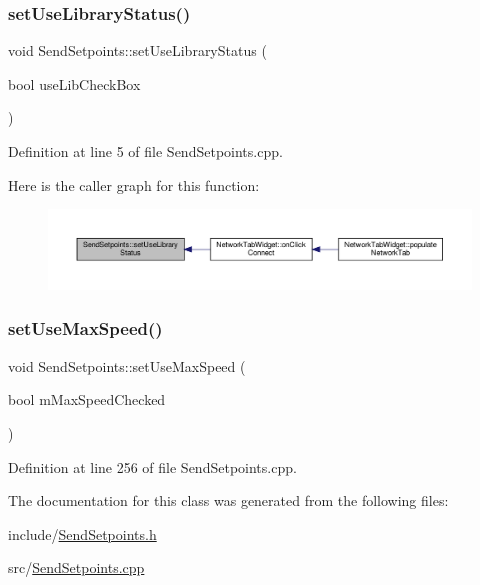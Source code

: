 \subsubsection{\texorpdfstring{set\+Use\+Library\+Status()}{setUseLibraryStatus()}}
{\footnotesize\ttfamily void Send\+Setpoints\+::set\+Use\+Library\+Status (\begin{DoxyParamCaption}\item[{bool}]{use\+Lib\+Check\+Box }\end{DoxyParamCaption})}



Definition at line 5 of file Send\+Setpoints.\+cpp.

Here is the caller graph for this function\+:
\nopagebreak
\begin{figure}[H]
\begin{center}
\leavevmode
\includegraphics[width=350pt]{class_send_setpoints_acb1a31e0cd0938661034d3c1a4dad8c7_icgraph}
\end{center}
\end{figure}
\mbox{\label{class_send_setpoints_a74d189d69d54abd6dd502d6b6dca3cb5}} 
\subsubsection{\texorpdfstring{set\+Use\+Max\+Speed()}{setUseMaxSpeed()}}
{\footnotesize\ttfamily void Send\+Setpoints\+::set\+Use\+Max\+Speed (\begin{DoxyParamCaption}\item[{bool}]{m\+Max\+Speed\+Checked }\end{DoxyParamCaption})}



Definition at line 256 of file Send\+Setpoints.\+cpp.



The documentation for this class was generated from the following files\+:\begin{DoxyCompactItemize}
\item 
include/\hyperlink{_send_setpoints_8h}{Send\+Setpoints.\+h}\item 
src/\hyperlink{_send_setpoints_8cpp}{Send\+Setpoints.\+cpp}\end{DoxyCompactItemize}
